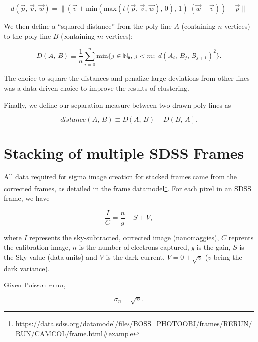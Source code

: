 \documentclass[../main.tex]{subfiles}
\begin{document}
\begin{equation}
d(\vec{p},\,\vec{v},\,\vec{w}) = \|\left(\vec{v} + \mathrm{min}(\mathrm{max}(t(\vec{p},\,\vec{v},\,\vec{w}),\, 0),\, 1)\;(\vec{w} - \vec{v})\right) - \vec{p}\|
\end{equation}

We then define a ``squared distance'' from the poly-line $A$ (containing $n$ vertices) to the poly-line $B$ (containing $m$ vertices):

\begin{equation}
D(A,\,B) \equiv \frac{1}{n}\sum_{i = 0}^{n} \mathrm{min}\{j \in \mathbb{N}_0,\, j < m;\; d(A_i,\, B_j,\, B_{j+1})^2\}.
\end{equation}

The choice to square the distances and penalize large deviations from other lines was a data-driven choice to improve the results of clustering.

Finally, we define our separation measure between two drawn poly-lines as

\begin{equation}
distance(A,\,B) \equiv D(A,\,B) + D(B,\,A).
\end{equation}


\section{Stacking of multiple SDSS Frames}
\label{appendix:frame_stacking}

 All data required for sigma image creation for stacked frames came from the corrected frames, as detailed in the frame datamodel\footnote{\url{https://data.sdss.org/datamodel/files/BOSS_PHOTOOBJ/frames/RERUN/RUN/CAMCOL/frame.html\#example}}. For each pixel in an SDSS frame, we have

\begin{equation}
\frac{I}{C} = \frac{n}{g} - S + V,
\end{equation}

where $I$ represents the sky-subtracted, corrected image (nanomaggies), $C$ reprents the calibration image, $n$ is the number of electrons captured, $g$ is the gain, $S$ is the Sky value (data units) and $V$ is the dark current, $V = 0 ± \sqrt{v}$ ($v$ being the dark variance).

Given Poisson error,

\begin{equation}
\sigma_n = \sqrt{n}.
\end{equation}
\end{document}
